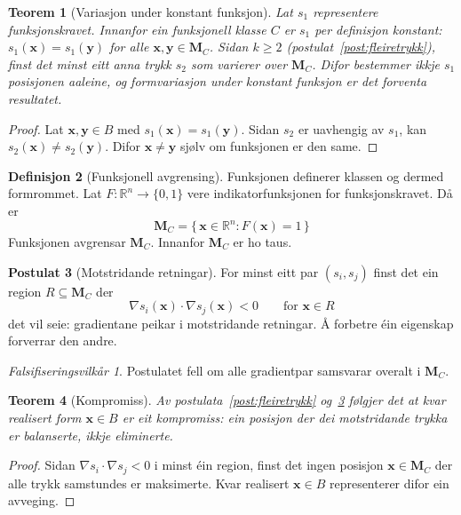 \documentclass[11pt, a4paper]{article}
\theoremstyle{definition}
\newtheorem{defn}{Definisjon}[section]
\newtheorem{postulat}[defn]{Postulat}
\theoremstyle{plain}
\newtheorem{teorem}[defn]{Teorem}
\theoremstyle{remark}
\newtheorem*{falsifisering}{Falsifiseringsvilk\aa r}
\newcommand{\MC}{\mathbf{M}_C}
\newcommand{\x}{\mathbf{x}}
\newcommand{\y}{\mathbf{y}}
\newcommand{\Reals}{\mathbb{R}}
\begin{document}
\begin{teorem}[Variasjon under konstant funksjon]
\label{teo:variasjon}
Lat $s_1$ representere funksjonskravet. Innanfor ein funksjonell klasse $C$ er $s_1$
per definisjon konstant: $s_1(\x) = s_1(\y)$ for alle $\x, \y \in \MC$.
Sidan $k \ge 2$ (postulat~\ref{post:fleiretrykk}), finst det minst eitt anna trykk
$s_2$ som varierer over $\MC$. Difor bestemmer ikkje $s_1$ posisjonen aaleine,
og formvariasjon under konstant funksjon er det forventa resultatet.
\end{teorem}

\begin{proof}
Lat $\x, \y \in B$ med $s_1(\x) = s_1(\y)$. Sidan $s_2$ er uavhengig av $s_1$,
kan $s_2(\x) \neq s_2(\y)$. Difor $\x \neq \y$ sj\o lv om funksjonen er den same.
\end{proof}

\begin{defn}[Funksjonell avgrensing]
\label{def:funksjonell-avgrensing}
Funksjonen definerer klassen og dermed formrommet. Lat $F : \Reals^n \to \{0, 1\}$
vere indikatorfunksjonen for funksjonskravet. D\aa{} er
\[
  \MC = \bigl\{\,\x \in \Reals^n : F(\x) = 1\,\bigr\}
\]
Funksjonen avgrensar $\MC$. Innanfor $\MC$ er ho taus.
\end{defn}

\begin{postulat}[Motstridande retningar]
\label{post:motstridande}
For minst eitt par $(s_i, s_j)$ finst det ein region $R \subseteq \MC$ der
\[
  \nabla s_i(\x) \cdot \nabla s_j(\x) < 0
  \qquad \text{for } \x \in R
\]
det vil seie: gradientane peikar i motstridande retningar.
\AA{} forbetre \'ein eigenskap forverrar den andre.
\end{postulat}

\begin{falsifisering}
Postulatet fell om alle gradientpar samsvarar overalt i $\MC$.
\end{falsifisering}

\begin{teorem}[Kompromiss]
\label{teo:kompromiss}
Av postulata~\ref{post:fleiretrykk} og~\ref{post:motstridande} f\o lgjer det at
kvar realisert form $\x \in B$ er eit kompromiss: ein posisjon der dei motstridande
trykka er balanserte, ikkje eliminerte.
\end{teorem}

\begin{proof}
Sidan $\nabla s_i \cdot \nabla s_j < 0$ i minst \'ein region, finst det ingen posisjon
$\x \in \MC$ der alle trykk samstundes er maksimerte.
Kvar realisert $\x \in B$ representerer difor ein avveging.
\end{proof}
\end{document}
